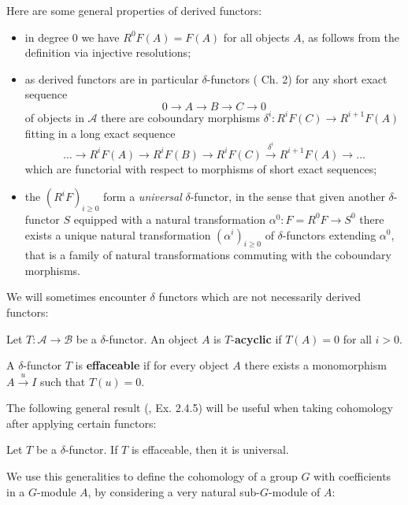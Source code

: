 \documentclass[a4paper, oneside]{memoir}
\begin{document}
\medskip \noindent Here are some general properties of derived functors:
\begin{itemize}
    \item in degree $0$ we have $R^0F(A)=F(A)$ for all objects $A$, as follows from the definition via injective resolutions;
    \item as derived functors are in particular $\delta$-functors (\cite{Weibel} Ch. 2)
          for any short exact sequence
          \[
              0\to A\to B\to C\to 0
          \]
          of objects in $\mathcal{A}$ there are coboundary morphisms $\delta^i:R^iF(C)\to R^{i+1}F(A)$ fitting in a long exact sequence
          \[
              \ldots\to R^iF(A)\to R^iF(B)\to R^iF(C)\overset{\delta^i}{\to} R^{i+1}F(A)\to\ldots
          \]
          which are functorial with respect to morphisms of short exact sequences;
    \item the $(R^iF)_{i\geq 0}$ form a \textit{universal} $\delta$-functor, in the sense that given another $\delta$-functor $S$ equipped with a natural transformation $\alpha^0:F=R^0F\to S^0$ there exists a unique natural transformation $(\alpha^i)_{i\geq 0}$ of $\delta$-functors extending $\alpha^0$, that is a family of natural transformations commuting with the coboundary morphisms.
\end{itemize}

We will sometimes encounter $\delta$ functors which are not necessarily derived functors:
\begin{definition}
    Let $T:\mathcal{A}\to\mathcal{B}$ be a $\delta$-functor. An object $A$ is $T$-\textbf{acyclic} if $T(A)=0$ for all $i>0$.
\end{definition}

\begin{definition}
    A $\delta$-functor $T$ is \textbf{effaceable} if for every object $A$ there exists a monomorphism $A\overset{u}{\to} I$ such that $T(u)=0$.
\end{definition}

The following general result (\cite{Weibel}, Ex. 2.4.5) will be useful when taking cohomology after applying certain functors:

\begin{proposition}\label{prop:Effaceable}
    Let $T$ be a $\delta$-functor. If $T$ is effaceable, then it is universal.
\end{proposition}


We use this generalities to define the cohomology of a group $G$ with coefficients in a $G$-module $A$, by considering a very natural sub-$G$-module of $A$:
\end{document}

